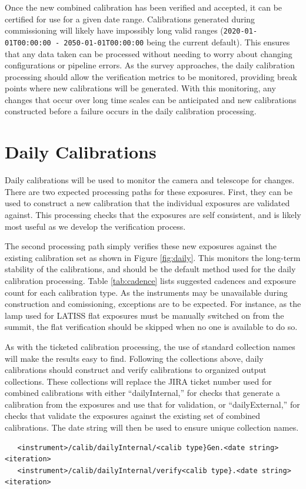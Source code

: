 \documentclass[DM,authoryear,toc]{lsstdoc}
\begin{document}
Once the new combined calibration has been verified and accepted, it can be certified for use for a given date range.  Calibrations generated during commissioning will likely have impossibly long valid ranges (\verb|2020-01-01T00:00:00 - 2050-01-01T00:00:00| being the current default). This ensures that any data taken can be processed without needing to worry about changing configurations or pipeline errors.   As the survey approaches, the daily calibration processing should allow the verification metrics to be monitored, providing break points where new calibrations will be generated.  With this monitoring, any changes that occur over long time scales can be anticipated and new calibrations constructed before a failure occurs in the daily calibration processing.

\section{Daily Calibrations}

Daily calibrations will be used to monitor the camera and telescope for changes.  There are two expected processing paths for these exposures.  First, they can be used to construct a new calibration that the individual exposures are validated against.  This processing checks that the exposures are self consistent, and is likely most useful as we develop the verification process.

The second processing path simply verifies these new exposures against the existing calibration set as shown in Figure \ref{fig:daily}.  This monitors the long-term stability of the calibrations, and should be the default method used for the daily calibration processing.  Table \ref{tab:cadence} lists suggested cadences and exposure count for each calibration type.  As the instruments may be unavailable during construction and comissioning, exceptions are to be expected.  For instance, as the lamp used for LATISS flat exposures must be manually switched on from the summit, the flat verification should be skipped when no one is available to do so.

As with the ticketed calibration processing, the use of standard collection names will make the results easy to find.  Following the collections above, daily calibrations should construct and verify calibrations to organized output collections.  These collections will replace the JIRA ticket number used for combined calibrations with either ``dailyInternal,'' for checks that generate a calibration from the exposures and use that for validation, or ``dailyExternal,'' for checks that validate the exposures against the existing set of combined calibrations.  The date string will then be used to ensure unique collection names.
\begin{verbatim}
   <instrument>/calib/dailyInternal/<calib type}Gen.<date string><iteration>
   <instrument>/calib/dailyInternal/verify<calib type}.<date string><iteration>
\end{verbatim}
\end{document}
